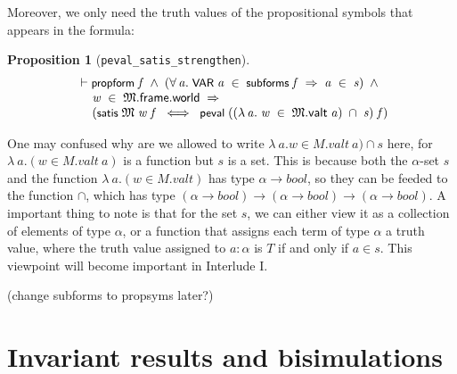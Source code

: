 \documentclass[letterpaper]{article}
\newtheorem{prop}{Proposition}
\renewcommand{\HOLConst}[1]{{\textsf{\upshape\small #1}}}
\newenvironment{holmath}{\begin{displaymath}\begin{array}{l}}{\end{array}\end{displaymath}\ignorespacesafterend}
\begin{document}
Moreover, we only need the truth values of the propositional symbols that appears in the formula:
\begin{prop}[\texttt{peval_satis_strengthen}]
\begin{holmath}
  \ensuremath{\HOLTokenTurnstile}\HOLConst{propform}\;\HOLFreeVar{f}\;\HOLSymConst{\HOLTokenConj{}}\;(\HOLSymConst{\HOLTokenForall{}}\HOLBoundVar{a}.\;\HOLConst{VAR}\;\HOLBoundVar{a}\;\HOLSymConst{\HOLTokenIn{}}\;\HOLConst{subforms}\;\HOLFreeVar{f}\;\HOLSymConst{\HOLTokenImp{}}\;\HOLBoundVar{a}\;\HOLSymConst{\HOLTokenIn{}}\;\HOLFreeVar{s})\;\HOLSymConst{\HOLTokenConj{}}\\
\;\;\;\;\;\HOLFreeVar{w}\;\HOLSymConst{\HOLTokenIn{}}\;\HOLFreeVar{\ensuremath{\mathfrak{M}}}.\HOLFieldName{frame}.\HOLFieldName{world}\;\HOLSymConst{\HOLTokenImp{}}\\
\;\;\;\;\;(\HOLConst{satis}\;\HOLFreeVar{\ensuremath{\mathfrak{M}}}\;\HOLFreeVar{w}\;\HOLFreeVar{f}\;\HOLSymConst{\HOLTokenEquiv{}}\;\HOLConst{peval}\;((\HOLTokenLambda{}\HOLBoundVar{a}.\;\HOLFreeVar{w}\;\HOLSymConst{\HOLTokenIn{}}\;\HOLFreeVar{\ensuremath{\mathfrak{M}}}.\HOLFieldName{valt}\;\HOLBoundVar{a})\;\HOLSymConst{\HOLTokenInter{}}\;\HOLFreeVar{s})\;\HOLFreeVar{f})
\end{holmath}
\end{prop}
One may confused why are we allowed to write $\lambda \ a. w \in M.valt \ a) \cap s$ here, for $\lambda \ a. (w \in M.valt\ a)$ is a function but $s$ is a set. This is because both the $\alpha$-set $s$ and the function $\lambda \ a. (w \in M.valt)$ has type $\alpha\to bool$, so they can be feeded to the function $\cap$, which has type $(\alpha\to bool)\to (\alpha\to bool)\to (\alpha\to bool)$. A important thing to note is that for the set $s$, we can either view it as a collection of elements of type $\alpha$, or a function that assigns each term of type $\alpha$ a truth value, where the truth value assigned to $a:\alpha$ is $T$ if and only if $a\in s$. This viewpoint will become important in Interlude I.

(change subforms to propsyms later?)

\section{Invariant results and bisimulations}
\end{document}
